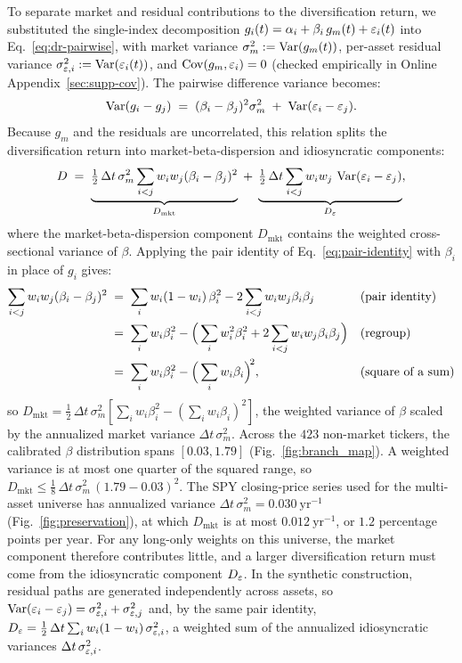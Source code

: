 To separate market and residual contributions to the diversification
return, we substituted the single-index decomposition
$g_i(t) = \alpha_i + \beta_i\, g_m(t) + \varepsilon_i(t)$ into
Eq.~\eqref{eq:dr-pairwise}, with market variance
$\sigma_m^2 := \operatorname{Var}(g_m(t))$, per-asset residual variance
$\sigma_{\varepsilon,i}^2 := \operatorname{Var}(\varepsilon_i(t))$, and $\operatorname{Cov}(g_m, \varepsilon_i) = 0$
(checked empirically in Online Appendix~\ref{sec:supp-cov}). The
pairwise difference variance becomes:
\begin{equation}
  \operatorname{Var}(g_i - g_j) \;=\; (\beta_i - \beta_j)^2 \sigma_m^2
  \;+\; \operatorname{Var}(\varepsilon_i - \varepsilon_j).
\end{equation}
Because $g_m$ and the residuals are uncorrelated, this relation splits
the diversification return into market-beta-dispersion and
idiosyncratic components:
\begin{equation}
  D \;=\;
  \underbrace{\tfrac{1}{2}\,\Delta t\,\sigma_m^2 \sum_{i<j} w_i w_j (\beta_i - \beta_j)^2}_{D_{\mathrm{mkt}}}
  \;+\;
  \underbrace{\tfrac{1}{2}\,\Delta t \sum_{i<j} w_i w_j \,\operatorname{Var}(\varepsilon_i - \varepsilon_j)}_{D_\varepsilon},
  \label{eq:dr-sim}
\end{equation}
where the market-beta-dispersion component $D_\mathrm{mkt}$ contains
the weighted cross-sectional variance of $\beta$. Applying the pair
identity of Eq.~\eqref{eq:pair-identity} with $\beta_i$ in place of
$g_i$ gives:
\begin{align}
  \sum_{i<j} w_i w_j (\beta_i - \beta_j)^2
   &\;=\; \sum_i w_i (1 - w_i)\, \beta_i^2
     - 2 \sum_{i<j} w_i w_j \beta_i \beta_j
     && \text{(pair identity)} \notag \\
   &\;=\; \sum_i w_i \beta_i^2
     - \Big(\sum_i w_i^2 \beta_i^2
     + 2 \sum_{i<j} w_i w_j \beta_i \beta_j\Big)
     && \text{(regroup)} \notag \\
   &\;=\; \sum_i w_i \beta_i^2 - \Big(\sum_i w_i \beta_i\Big)^{\!2},
     && \text{(square of a sum)}
\end{align}
so $D_\mathrm{mkt} = \tfrac{1}{2}\,\Delta t\,\sigma_m^2 [\sum_i w_i
\beta_i^2 - (\sum_i w_i \beta_i)^2]$, the weighted variance of $\beta$
scaled by the annualized market variance $\Delta t\,\sigma_m^2$.
Across the $423$ non-market tickers, the calibrated $\beta$
distribution spans $[0.03, 1.79]$ (Fig.~\ref{fig:branch_map}). A
weighted variance is at most one quarter of the squared range, so
$D_{\mathrm{mkt}} \le \tfrac{1}{8}\,\Delta t\,\sigma_m^2\,(1.79 -
0.03)^2$. The SPY closing-price series used for the multi-asset
universe has annualized variance $\Delta t\,\sigma_m^2 =
0.030~\mathrm{yr}^{-1}$ (Fig.~\ref{fig:preservation}), at which
$D_{\mathrm{mkt}}$ is at most $0.012~\mathrm{yr}^{-1}$, or $1.2$
percentage points per year. For any long-only weights on this
universe, the market component therefore contributes little, and a
larger diversification return must come from the idiosyncratic
component $D_\varepsilon$. In the synthetic construction, residual paths are
generated independently across assets, so
$\operatorname{Var}(\varepsilon_i - \varepsilon_j) = \sigma_{\varepsilon,i}^2 + \sigma_{\varepsilon,j}^2$ and,
by the same pair identity,
$D_\varepsilon = \tfrac{1}{2}\,\Delta t \sum_i w_i (1 - w_i)\,
\sigma_{\varepsilon,i}^2$, a weighted sum of the annualized idiosyncratic
variances $\Delta t\,\sigma_{\varepsilon,i}^2$.

